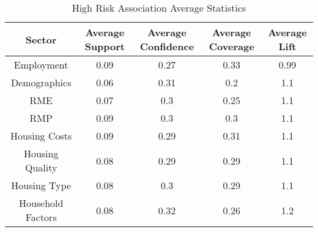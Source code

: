 \begin{table}[h]
    \centering
    \caption{High Risk Association Average Statistics}
    \label{tab:high_risk_ass} %
    \begin{tabular}{|c|c|c|c|c|}
    \hline
    Sector & Average Support & Average Confidence & Average Coverage & Average Lift \\
    \hline
    Employment & 0.09 & 0.27 & 0.33 & 0.99 \\
    \hline
    Demographics & 0.06 & 0.31 & 0.2 & 1.1 \\
    \hline
    RME & 0.07 & 0.3 & 0.25 & 1.1 \\
    \hline
    RMP & 0.09 & 0.3 & 0.3 & 1.1 \\
    \hline
    Housing Costs & 0.09 & 0.29 & 0.31 & 1.1 \\
    \hline
    Housing Quality & 0.08 & 0.29 & 0.29 & 1.1 \\
    \hline
    Housing Type & 0.08 & 0.3 & 0.29 & 1.1 \\
    \hline
    Household Factors & 0.08 & 0.32 & 0.26 & 1.2 \\
    \hline
    \end{tabular}
\end{table}